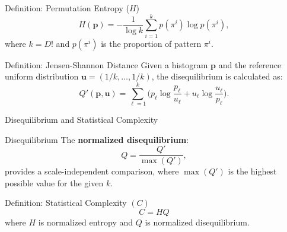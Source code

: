 \documentclass[11pt]{beamer}
\begin{document}
	\begin{frame}
	 
		\begin{block}{Definition: Permutation Entropy ($H$)}
			\[
			H(\mathbf{p}) = -\dfrac{1}{\log k} \sum_{i=1}^{k} p(\pi^i) \log p(\pi^i),
			\]
			where $k=D!$ and $p(\pi^i)$ is the proportion of pattern $\pi^i$.
		\end{block}
		
		\begin{block}{Definition: Jensen-Shannon Distance}
			Given a histogram $\mathbf{p}$ and the reference uniform distribution $\mathbf{u} = (1/k, \ldots, 1/k)$, the disequilibrium is calculated as:
			\[
			Q'(\mathbf{p},\mathbf{u}) = \sum_{\ell=1}^k \Big( p_\ell \log\frac{p_\ell}{u_\ell} + u_\ell \log\frac{u_\ell}{p_\ell} \Big).
			\]
		\end{block}		
		
	\end{frame}
	
	
	
	\begin{frame}{Disequilibrium and Statistical Complexity}
		\begin{block}{Disequilibrium}
			The \textbf{normalized disequilibrium}:
			\[
			Q = \frac{Q'}{\max(Q')},
			\]
			provides a scale-independent comparison, where $\max(Q')$ is the highest possible value for the given $k$.
		\end{block}
			\begin{block}{Definition: Statistical Complexity $(C)$ }
			\[
			C = H Q
			\]
			where $H$ is normalized entropy and $Q$ is normalized disequilibrium.
		\end{block}
	\end{frame}
		
\end{document}
